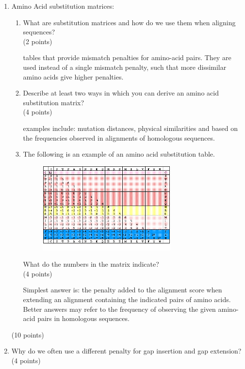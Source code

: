 \documentclass[11pt]{article}
\begin{document}
\begin{enumerate}
\item Amino Acid substitution matrices:
  \begin{enumerate}
  \item What are substitution matrices and how do we use them when aligning
    sequences?\\
    (2 points)
\begin{Notes}
  tables that provide mismatch penalties for amino-acid pairs. They are used
  instead of a single mismatch penalty, such that more dissimilar amino acids
  give higher penalties.
\end{Notes}
  \item Describe at least two ways in which you can derive an amino acid
    substitution matrix?\\
    (4 points)
\begin{Notes}
  examples include: mutation distances, physical similarities and based on the
  frequencies observed in alignments of homologous sequences.
\end{Notes}
  \item The following is an example of an amino acid substitution table.
    \begin{figure}[H]
      \includegraphics[width=0.7\textwidth]{images/dayhoff_256}
    \end{figure}
    What do the numbers in the matrix indicate?\\
    (4 points)
\begin{Notes}
  Simplest answer is: the penalty added to the alignment score when extending an alignment
  containing the indicated pairs of amino acids. Better answers may refer to
  the frequency of observing the given amino-acid pairs in homologous sequences.
\end{Notes}
  \end{enumerate}
  (10 points)
\item Why do we often use a different penalty for gap insertion and gap
  extension?\\
  (4 points)


\end{enumerate}
\end{document}
